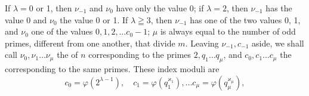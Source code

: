 If $\lambda = 0$ or 1, then $\nu_{-1}$ and $\nu_0$ have only the value 0;
if $\lambda = 2$, then $\nu_{-1}$ has the value 0 and $\nu_0$ the value 0 or 1.
If $\lambda \geqq 3$, then $\nu_{-1}$ has one of the two values 0, 1, and $\nu_0$
one of the values $0, 1, 2, \ldots c_0 - 1$; $\mu$ is always equal to the
number of odd primes, different from one another,
that divide $m$. Leaving $\nu_{-1}, c_{-1}$ aside, we shall
call $\nu_0, \nu_1 \ldots \nu_\mu$ the  of $n$ corresponding to the primes $2, q_1 \ldots q_\mu$,
and $c_0, c_1 \ldots c_\mu$ the  corresponding
to the same primes. These index moduli are
\[
c_0 = \varphi(2^{\lambda-1}), \quad c_1 = \varphi(q_1^{\varkappa_1}), \ldots c_\mu = \varphi(q_\mu^{\varkappa_\mu}),
\]
